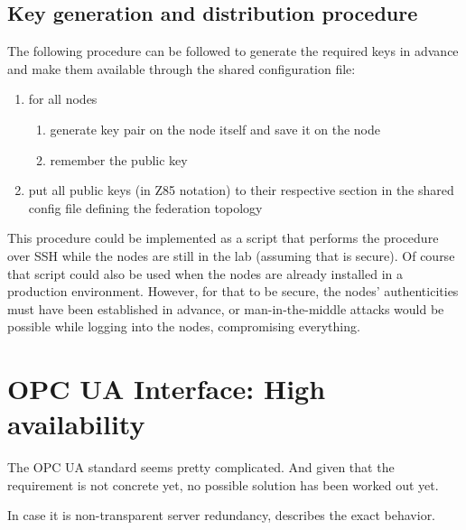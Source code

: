 \subsection{Key generation and distribution procedure}
The following procedure can be followed to generate the required keys in
advance and make them available through the shared configuration file:

\begin{enumerate}
	\item for all nodes
	\begin{enumerate}
		\item generate key pair on the node itself and save it on the
			node
		\item remember the public key
	\end{enumerate}

	\item put all public keys (in Z85 notation) to their respective section
		in the shared config file defining the federation topology
\end{enumerate}

This procedure could be implemented as a script that performs the procedure
over \gls{SSH} while the nodes are still in the
lab (assuming that is secure). Of course that script could also be used when
the nodes are already installed in a production environment. However, for that to be
secure, the nodes' authenticities must have been established in advance, or
man-in-the-middle attacks would be possible while logging into the nodes,
compromising everything.

\section{OPC UA Interface: High availability}\label{sec:approach:opc-ua}
The OPC UA standard seems pretty complicated. And given that the requirement
is not concrete yet, no possible solution has been worked out yet.

In case it is non-transparent server redundancy, \cite[6.4.2.4 Non-transparent
Redundancy, p.~96]{opc-ua:behavior:server-redundancy} describes the exact
behavior.

